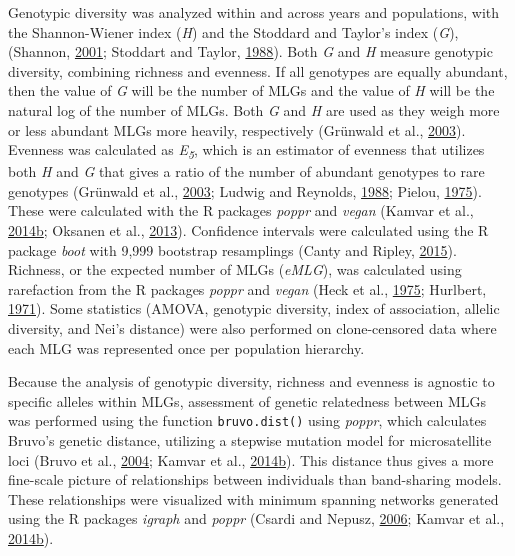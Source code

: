 \documentclass[double,12pt]{beavtex}
\begin{document}
  Genotypic diversity was analyzed within and across years and
  populations, with the Shannon-Wiener index (\emph{H}) and the Stoddard
  and Taylor's index (\emph{G}), (Shannon,
  \protect\hyperlink{ref-shannon2001mathematical}{2001}; Stoddart and
  Taylor, \protect\hyperlink{ref-stoddart1988genotypic}{1988}). Both
  \emph{G} and \emph{H} measure genotypic diversity, combining richness
  and evenness. If all genotypes are equally abundant, then the value of
  \emph{G} will be the number of MLGs and the value of \emph{H} will be
  the natural log of the number of MLGs. Both \emph{G} and \emph{H} are
  used as they weigh more or less abundant MLGs more heavily, respectively
  (Grünwald et al., \protect\hyperlink{ref-grunwald2003analysis}{2003}).
  Evenness was calculated as \emph{E\textsubscript{5}}, which is an
  estimator of evenness that utilizes both \emph{H} and \emph{G} that
  gives a ratio of the number of abundant genotypes to rare genotypes
  (Grünwald et al., \protect\hyperlink{ref-grunwald2003analysis}{2003};
  Ludwig and Reynolds,
  \protect\hyperlink{ref-ludwig1988statistical}{1988}; Pielou,
  \protect\hyperlink{ref-pielou1975ecological}{1975}). These were
  calculated with the R packages \emph{poppr} and \emph{vegan} (Kamvar et
  al.,
  \protect\hyperlink{ref-kamvar2014poppr}{2014}\protect\hyperlink{ref-kamvar2014poppr}{b};
  Oksanen et al., \protect\hyperlink{ref-oksanen2013vegan}{2013}).
  Confidence intervals were calculated using the R package \emph{boot}
  with 9,999 bootstrap resamplings (Canty and Ripley,
  \protect\hyperlink{ref-canty2015boot}{2015}). Richness, or the expected
  number of MLGs (\emph{eMLG}), was calculated using rarefaction from the
  R packages \emph{poppr} and \emph{vegan} (Heck et al.,
  \protect\hyperlink{ref-heck1975explicit}{1975}; Hurlbert,
  \protect\hyperlink{ref-hurlbert1971nonconcept}{1971}). Some statistics
  (AMOVA, genotypic diversity, index of association, allelic diversity,
  and Nei's distance) were also performed on clone-censored data where
  each MLG was represented once per population hierarchy.
  
  Because the analysis of genotypic diversity, richness and evenness is
  agnostic to specific alleles within MLGs, assessment of genetic
  relatedness between MLGs was performed using the function
  \texttt{bruvo.dist()} using \emph{poppr}, which calculates Bruvo's
  genetic distance, utilizing a stepwise mutation model for microsatellite
  loci (Bruvo et al., \protect\hyperlink{ref-bruvo2004simple}{2004};
  Kamvar et al.,
  \protect\hyperlink{ref-kamvar2014poppr}{2014}\protect\hyperlink{ref-kamvar2014poppr}{b}).
  This distance thus gives a more fine-scale picture of relationships
  between individuals than band-sharing models. These relationships were
  visualized with minimum spanning networks generated using the R packages
  \emph{igraph} and \emph{poppr} (Csardi and Nepusz,
  \protect\hyperlink{ref-csardi2006igraph}{2006}; Kamvar et al.,
  \protect\hyperlink{ref-kamvar2014poppr}{2014}\protect\hyperlink{ref-kamvar2014poppr}{b}).
  
\end{document}
